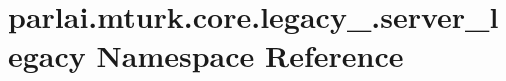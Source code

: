 \hypertarget{namespaceparlai_1_1mturk_1_1core_1_1legacy__2018_1_1server__legacy}{}\section{parlai.\+mturk.\+core.\+legacy\+\_.\+server\+\_\+legacy Namespace Reference}
\label{namespaceparlai_1_1mturk_1_1core_1_1legacy__2018_1_1server__legacy}
